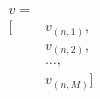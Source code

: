 \documentclass[preview]{standalone}
\begin{document}
\begin{align*}
v =\\ [ &v_{(n,1)},\\ &v_{(n,2)},\\ &\ldots ,\\ &v_{(n,M)}]
\end{align*}
\end{document}
